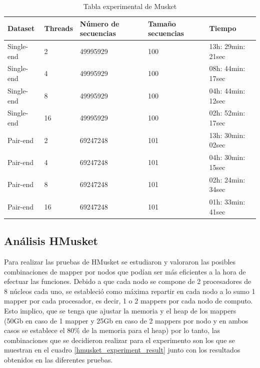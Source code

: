 \documentclass[conference]{IEEEtran}
\begin{document}
\begin{table}[t]
	\centering
	\label{musket_experiment_result}
	\begin{tabular}{|l|l|p{1.5cm}|p{1.3cm}|l|}
		\hline
		\textbf{Dataset} 	& \textbf{Threads} 	& \textbf{Número de secuencias} & \textbf{Tamaño secuencias} & \textbf{Tiempo}	\\ \hline
		Single-end 	& 2			& 49995929           & 100           & 13h: 29min: 21sec 	\\ \hline
		Single-end 	& 4			& 49995929           & 100           & 08h: 44min: 17sec	\\ \hline
		Single-end 	& 8			& 49995929           & 100           & 04h: 44min: 12sec 	\\ \hline
		Single-end 	& 16		& 49995929           & 100           & 02h: 52min: 17sec 	\\ \hline \hline
		Pair-end 	& 2			& 69247248           & 101           & 13h: 30min: 02sec 	\\ \hline
		Pair-end 	& 4			& 69247248           & 101           & 04h: 30min: 15sec	\\ \hline
		Pair-end 	& 8			& 69247248           & 101           & 02h: 24min: 34sec 	\\ \hline
		Pair-end 	& 16		& 69247248           & 101           & 01h: 33min: 41sec 	\\ \hline
	\end{tabular}
	\caption{Tabla experimental de Musket}
\end{table}

\subsection{Análisis HMusket}
Para realizar las pruebas de HMusket se estudiaron y valoraron las posibles combinaciones de mapper por nodos que podían ser más eficientes a la hora de efectuar las funciones. Debido a que cada nodo se compone de 2 procesadores de 8 núcleos cada uno, se estableció como máxima repartir en cada nodo a lo sumo 1 mapper por cada procesador, es decir, 1 o 2 mappers por cada nodo de computo. Esto implico, que se tenga que ajustar la memoria y el heap de los mappers (50Gb en caso de 1 mapper y 25Gb en caso de 2 mappers por nodo y en ambos casos se establece el 80\% de la memoria para el heap) por lo tanto, las combinaciones que se decidieron realizar para el experimento son los que se muestran en el cuadro \ref{hmusket_experiment_result} junto con los resultados obtenidos en las diferentes pruebas.\\
\end{document}
